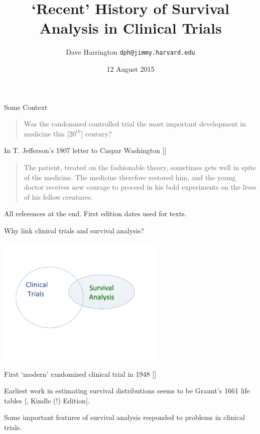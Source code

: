 \documentclass[11pt]{beamer}
\title[Clinical Trials \& Survival Analysis]%
{`Recent' History of Survival Analysis in Clinical Trials}
\author[Harrington] {Dave Harrington
 \texttt{dph@jimmy.harvard.edu} }
\institute %
[Harvard, DFCI] {{\color{brick} Harvard Statistics and Biostatistics, Dana-Farber Cancer Institute }}
\date{12 August 2015}
\begin{document}
\begin{frame}
 
 \titlepage
    
\end{frame}


\begin{frame}{Some Context}

\cite{smith1998clintrials}
    
\begin{quote}
    Was the randomised controlled trial the most
    important development in medicine this [$20^{th}$] century?
    
\end{quote}
    
In T. Jefferson's 1807 letter to Caspar Washington [\cite{jefferson1985letters}]

\begin{quote}
    
    The patient, treated on the fashionable theory, sometimes gets well in
    spite of the medicine. The medicine therefore restored him, and the young
    doctor receives new courage to proceed in his bold experiments on the
    lives of his fellow creatures.
    
\end{quote}
    
    
\textcolor{forest}{All references at the end.  First edition dates used for texts.}

\end{frame}

\begin{frame}[t]{Why link clinical trials and survival analysis?}
	
	
	\begin{center}
	\includegraphics[width= 0.60\textwidth]{clin_surv_venn.pdf}
	\end{center}

\vspace*{-0.5in}

First `modern' randomized clinical trial in 1948 [\cite{marshall1948streptomycin}]

Earliest work in estimating survival distributions seems to be Graunt's 1661 life tables [\cite{graunt2008natural}, Kindle (!) Edition]. 

	\textcolor{forest}{Some important features of survival analysis responded to problems in clinical trials.} 
	

\end{frame}
\end{document}
